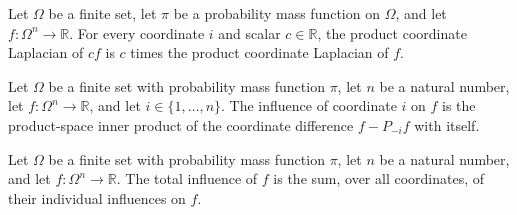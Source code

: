 \begin{theorem}
\label{FABL.productCoordinateLaplacian_smul}
\leanok
{}
Let $\Omega$ be a finite set, let $\pi$ be a probability mass function on $\Omega$, and
let $f:\Omega^n\to\mathbb R$. For every coordinate $i$ and scalar $c\in\mathbb R$, the
product coordinate Laplacian of $cf$ is $c$ times the product coordinate Laplacian of
$f$.
\end{theorem}

\begin{definition}
\label{FABL.productInfluence}
\leanok
{}
Let $\Omega$ be a finite set with probability mass function $\pi$, let $n$ be a natural
number, let $f:\Omega^n\to\mathbb R$, and let $i\in\{1,\ldots,n\}$. The influence of
coordinate $i$ on $f$ is the product-space inner product of the coordinate difference
$f-P_{-i}f$ with itself.
\end{definition}

\begin{definition}
\label{FABL.productTotalInfluence}
\leanok
{}
Let $\Omega$ be a finite set with probability mass function $\pi$, let $n$ be a natural
number, and let $f:\Omega^n\to\mathbb R$. The total influence of $f$ is the sum, over
all coordinates, of their individual influences on $f$.
\end{definition}

